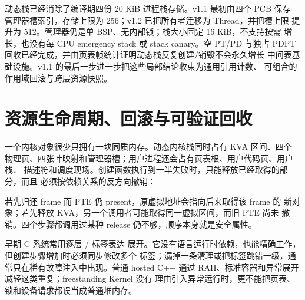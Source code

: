 动态栈已经消除了编译期四份 20 KiB 进程栈存储。v1.1 最初由四个 PCB 保存
管理器槽索引，存储上限为 256；v1.2 已把所有者迁移为 Thread，并把槽上限
提升为 512。管理器仍是单 BSP、无内部锁；栈大小固定 16 KiB，不支持按需
增长，也没有每 CPU emergency stack 或 stack canary。空 PT/PD 与独占
PDPT 回收已经完成，并由页表帧统计证明动态栈反复创建/销毁不会永久增长
中间表基础设施。v1.1 的最后一步进一步把这些局部结论收束为通用引用计数、
可组合的作用域回滚与跨层资源快照。

\section{资源生命周期、回滚与可验证回收}

一个内核对象很少只拥有一块同质内存。动态内核栈同时占有 KVA 区间、四个
物理页、四张叶映射和管理器槽；用户进程还会占有页表根、用户代码页、用户栈、
描述符和调度现场。创建函数执行到一半失败时，只能释放已经取得的部分，而且
必须按依赖关系的反方向撤销：

\begin{center}
\end{center}

若先归还 frame 而 PTE 仍 present，原虚拟地址会指向后来取得该 frame 的
新对象；若先释放 KVA，另一个调用者可能取得同一虚拟区间，而旧 PTE 尚未
撤销。四个步骤都调用过某种 release 仍不够，顺序本身就是安全属性。

早期 C 系统常用逐层 / 标签表达
展开。它没有语言运行时依赖，也能精确工作，但创建步骤增加时必须同步修改多个
标签；漏掉一条清理或把标签跳错一级，通常只在稀有故障注入中出现。普通 hosted
C++ 通过 RAII、标准容器和异常展开减轻这类重复；freestanding Kernel 没有
理由引入异常运行时，更不能把页表、锁和设备请求都误当成普通堆内存。

